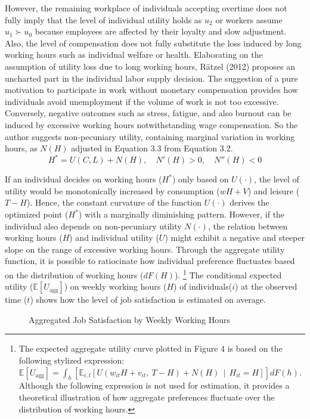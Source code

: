 \documentclass[
  12pt,
]{article}
\makeatletter
\newcommand*\pandocbounded[1]{%
  \sbox\pandoc@box{#1}%
  \Gscale@div\@tempa{\textheight}{\dimexpr\ht\pandoc@box+\dp\pandoc@box\relax}%
  \Gscale@div\@tempb{\linewidth}{\wd\pandoc@box}%
  \ifdim\@tempb\p@<\@tempa\p@\let\@tempa\@tempb\fi%
  \ifdim\@tempa\p@<\p@\scalebox{\@tempa}{\usebox\pandoc@box}%
  \else\usebox{\pandoc@box}%
  \fi%
}
\makeatother
\begin{document}
However, the remaining workplace of individuals accepting overtime does
not fully imply that the level of individual utility holds as \(u_2\) or
workers assume \(u_1 \succ u_0\) because employees are affected by their
loyalty and slow adjustment. Also, the level of compensation does not
fully substitute the loss induced by long working hours such as
individual welfare or health. Elaborating on the assumption of utility
loss due to long working hours, Rätzel (2012) proposes an uncharted part
in the individual labor supply decision. The suggestion of a pure
motivation to participate in work without monetary compensation provides
how individuals avoid unemployment if the volume of work is not too
excessive. Conversely, negative outcomes such as stress, fatigue, and
also burnout can be induced by excessive working hours notwithstanding
wage compensation. So the author suggests non-pecuniary utility,
containing marginal variation in working hours, as \(N(H)\) adjusted in
Equation 3.3 from Equation 3.2. \[
H^* = U(C,L) +N(H), \quad N'(H)>0, \quad N''(H)<0
\tag{3.3}
\]

If an individual decides on working hours (\(H^*\)) only based on
\(U(\cdot)\), the level of utility would be monotonically increased by
consumption (\(wH+V\)) and leisure (\(T-H\)). Hence, the constant
curvature of the function \(U(\cdot)\) derives the optimized point
(\(H^*\)) with a marginally diminishing pattern. However, if the
individual also depends on non-pecuniary utility \(N(\cdot)\), the
relation between working hours (\(H\)) and individual utility (\(U\))
might exhibit a negative and steeper slope on the range of excessive
working hours. Through the aggregate utility function, it is possible to
ratiocinate how individual preference fluctuates based on the
distribution of working hours (\(dF(H)\)). \footnote{The expected
  aggregate utility curve plotted in Figure 4 is based on the following
  stylized expression:
  \(\mathbb{E}[U_{\text{agg}}] = \int_h \left[ \mathbb{E}_{i,t} \left[ U(w_{it} H + v_{it},\ T - H) + N(H) \,\middle|\, H_{it} = H \right] \right] dF(h)\).
  Although the following expression is not used for estimation, it
  provides a theoretical illustration of how aggregate preferences
  fluctuate over the distribution of working hours.} The conditional
expected utility (\(\mathbb{E}[U_{\text{agg}}]\)) on weekly working
hours (\(H\)) of individuals(\(i\)) at the observed time (\(t\)) shows
how the level of job satisfaction is estimated on average.

\begin{figure}
\centering
\pandocbounded{\texttt{[image: images/Graph\_working hour(week).png]}}
\caption{Aggregated Job Satisfaction by Weekly Working Hours}
\end{figure}
\end{document}
